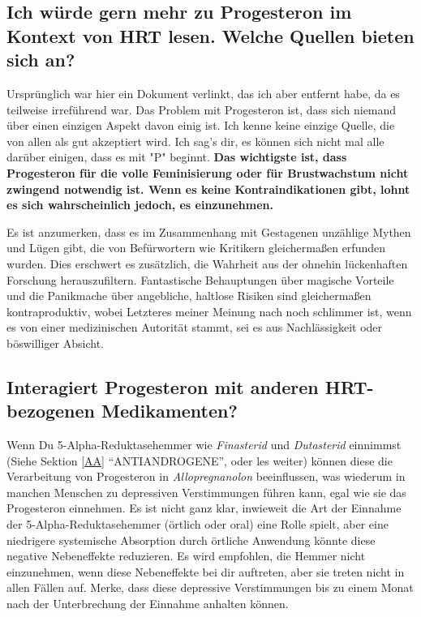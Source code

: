 \documentclass{article}
\begin{document}
{{{\subsection{Ich würde gern mehr zu Progesteron im Kontext von HRT lesen. Welche Quellen bieten sich an?}\label{8-17}

Ursprünglich war hier ein Dokument verlinkt, das ich aber entfernt habe, da es teilweise irreführend war. Das Problem mit Progesteron ist, dass sich niemand über einen einzigen Aspekt davon einig ist. Ich kenne keine einzige Quelle, die von allen als gut akzeptiert wird. Ich sag's dir, es können sich nicht mal alle darüber einigen, dass es mit "P" beginnt. \textbf{Das wichtigste ist, dass Progesteron für die volle Feminisierung oder für Brustwachstum nicht zwingend notwendig ist. Wenn es keine Kontraindikationen gibt, lohnt es sich wahrscheinlich jedoch, es einzunehmen.}

Es ist anzumerken, dass es im Zusammenhang mit Gestagenen unzählige Mythen und Lügen gibt, die von Befürwortern wie Kritikern gleichermaßen erfunden wurden. Dies erschwert es zusätzlich, die Wahrheit aus der ohnehin lückenhaften Forschung herauszufiltern. Fantastische Behauptungen über magische Vorteile und die Panikmache über angebliche, haltlose Risiken sind gleichermaßen kontraproduktiv, wobei Letzteres meiner Meinung nach noch schlimmer ist, wenn es von einer medizinischen Autorität stammt, sei es aus Nachlässigkeit oder böswilliger Absicht.

\subsection{Interagiert Progesteron mit anderen HRT-bezogenen Medikamenten?}\label{8-18}

Wenn Du 5-Alpha-Reduktasehemmer wie \textit{Finasterid} und \textit{Dutasterid} einnimmst (Siehe Sektion \ref{AA} “ANTIANDROGENE”, oder les weiter) können diese die Verarbeitung von Progesteron in \textit{Allopregnanolon} beeinflussen, was wiederum in manchen Menschen zu depressiven Verstimmungen führen kann, egal wie sie das Progesteron einnehmen. Es ist nicht ganz klar, inwieweit die Art der Einnahme der 5-Alpha-Reduktasehemmer (örtlich oder oral) eine Rolle spielt, aber eine niedrigere systemische Absorption durch örtliche Anwendung könnte diese negative Nebeneffekte reduzieren. Es wird empfohlen, die Hemmer nicht einzunehmen, wenn diese Nebeneffekte bei dir auftreten, aber sie treten nicht in allen Fällen auf. Merke, dass diese depressive Verstimmungen bis zu einem Monat nach der Unterbrechung der Einnahme anhalten können. 
 

}}}
\end{document}
